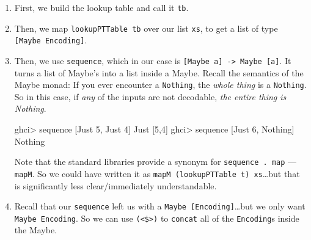 \documentclass[]{article}
\newenvironment{Shaded}{}{}
\newcommand{\DataTypeTok}[1]{\textcolor[rgb]{0.56,0.13,0.00}{#1}}
\newcommand{\DecValTok}[1]{\textcolor[rgb]{0.25,0.63,0.44}{#1}}
\newcommand{\FunctionTok}[1]{\textcolor[rgb]{0.02,0.16,0.49}{#1}}
\newcommand{\NormalTok}[1]{#1}
\begin{document}
\begin{enumerate}
\def\labelenumi{\arabic{enumi}.}
\item
  First, we build the lookup table and call it \texttt{tb}.
\item
  Then, we map \texttt{lookupPTTable\ tb} over our list \texttt{xs}, to get a
  list of type \texttt{{[}Maybe\ Encoding{]}}.
\item
  Then, we use \texttt{sequence}, which in our case is
  \texttt{{[}Maybe\ a{]}\ -\textgreater{}\ Maybe\ {[}a{]}}. It turns a list of
  Maybe's into a list inside a Maybe. Recall the semantics of the Maybe monad:
  If you ever encounter a \texttt{Nothing}, the \emph{whole thing} is a
  \texttt{Nothing}. So in this case, if \emph{any} of the inputs are not
  decodable, \emph{the entire thing is Nothing}.

\begin{Shaded}
\begin{Highlighting}[]
\NormalTok{ghci}\FunctionTok{>}\NormalTok{ sequence [}\DataTypeTok{Just} \DecValTok{5}\NormalTok{, }\DataTypeTok{Just} \DecValTok{4}\NormalTok{]}
\DataTypeTok{Just}\NormalTok{ [}\DecValTok{5}\NormalTok{,}\DecValTok{4}\NormalTok{]}
\NormalTok{ghci}\FunctionTok{>}\NormalTok{ sequence [}\DataTypeTok{Just} \DecValTok{6}\NormalTok{, }\DataTypeTok{Nothing}\NormalTok{]}
\DataTypeTok{Nothing}
\end{Highlighting}
\end{Shaded}

  Note that the standard libraries provide a synonym for
  \texttt{sequence\ .\ map} --- \texttt{mapM}. So we could have written it as
  \texttt{mapM\ (lookupPTTable\ t)\ xs}\ldots{}but that is significantly less
  clear/immediately understandable.
\item
  Recall that our \texttt{sequence} left us with a
  \texttt{Maybe\ {[}Encoding{]}}\ldots{}but we only want
  \texttt{Maybe\ Encoding}. So we can use \texttt{(\textless{}\$\textgreater{})}
  to \texttt{concat} all of the \texttt{Encoding}s inside the Maybe.
\end{enumerate}
\end{document}
